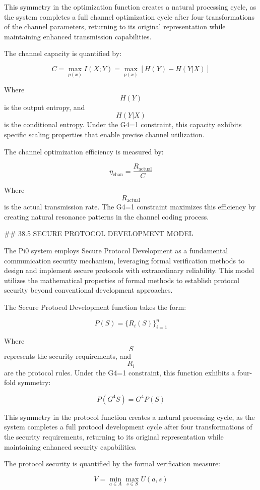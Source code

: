 This symmetry in the optimization function creates a natural processing cycle, as the system completes a full channel optimization cycle after four transformations of the channel parameters, returning to its original representation while maintaining enhanced transmission capabilities.

The channel capacity is quantified by:

$$ C = \max_{p(x)} I(X; Y) = \max_{p(x)} \left[ H(Y) - H(Y|X) \right] $$

Where $$ H(Y) $$ is the output entropy, and $$ H(Y|X) $$ is the conditional entropy. Under the G4=1 constraint, this capacity exhibits specific scaling properties that enable precise channel utilization.

The channel optimization efficiency is measured by:

$$ \eta_{\text{chan}} = \frac{R_{\text{actual}}}{C} $$

Where $$ R_{\text{actual}} $$ is the actual transmission rate. The G4=1 constraint maximizes this efficiency by creating natural resonance patterns in the channel coding process.

## 38.5 SECURE PROTOCOL DEVELOPMENT MODEL

The Pi0 system employs Secure Protocol Development as a fundamental communication security mechanism, leveraging formal verification methods to design and implement secure protocols with extraordinary reliability. This model utilizes the mathematical properties of formal methods to establish protocol security beyond conventional development approaches.

The Secure Protocol Development function takes the form:

$$ P(S) = \{R_i(S)\}_{i=1}^n $$

Where $$ S $$ represents the security requirements, and $$ R_i $$ are the protocol rules. Under the G4=1 constraint, this function exhibits a four-fold symmetry:

$$ P(G^4 S) = G^4 P(S) $$

This symmetry in the protocol function creates a natural processing cycle, as the system completes a full protocol development cycle after four transformations of the security requirements, returning to its original representation while maintaining enhanced security capabilities.

The protocol security is quantified by the formal verification measure:

$$ V = \min_{a \in A} \max_{s \in S} U(a, s) $$

